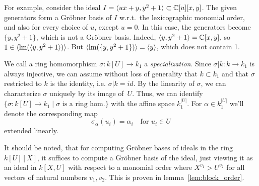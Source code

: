 For example, consider the ideal $I = \langle ux + y, y^{2} + 1 \rangle \subset \mathbb{C}[u][x, y]$. The given generators form a Gröbner basis of $I$ w.r.t.\ the lexicographic monomial order, and also for every choice of $u$, except $u = 0$. In this case, the generators become $\{y, y^{2} + 1\}$, which is not a Gröbner basis. Indeed, $\langle y, y^{2} + 1 \rangle = \mathbb{C}[x, y]$, so $1 \in \langle \operatorname{lm}(\langle y, y^{2} + 1 \rangle) \rangle$. But $\langle \operatorname{lm}(\{y, y^{2} + 1\}) \rangle = \langle y \rangle$, which does not contain 1.

We call a ring homomorphism $\sigma : k[U] \to k_{1}$ a \textit{specialization}. Since $\sigma|k : k \to k_{1}$ is always injective, we can assume without loss of generality that $k \subset k_{1}$ and that $\sigma$ restricted to $k$ is the identity, i.e. $\sigma|k = id$. By the linearity of $\sigma$, we can characterize $\sigma$ uniquely by its image of $\,U$. Thus, we can identify $\{\sigma : k[U] \to k_{1} \mid \sigma \text{ is a ring hom.}\}$ with the affine space $k_{1}^{|U|}$. For $\alpha \in k_{1}^{|U|}$ we'll denote the corresponding map
\[\sigma_{\alpha}(u_{i}) = \alpha_{i} \quad \text{for $u_{i} \in U$}\] extended linearly.

It should be noted, that for computing Gröbner bases of ideals in the ring $k[U][X]$, it suffices to compute a Gröbner basis of the ideal, just viewing it as an ideal in $k[X, U]$ with respect to a monomial order where $X^{v_{1}} > U^{v_{2}}$ for all vectors of natural numbers $v_{1}, v_{2}$. This is proven in lemma~\ref{lem:block_order}.

